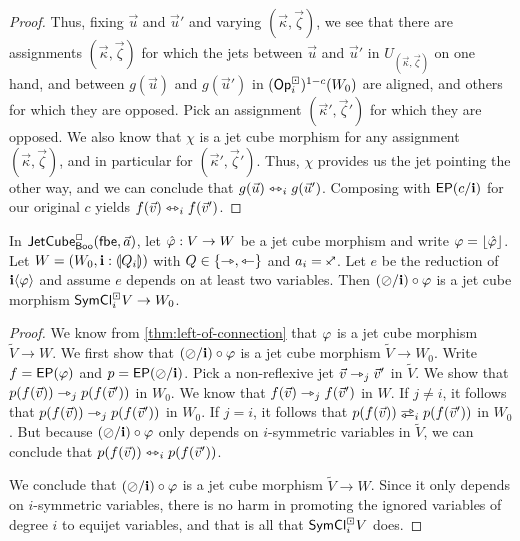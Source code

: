 \documentclass[a4paper]{memoir}
\begin{document}
\begin{proof}
	Thus, fixing $\vec u$ and $\vec u'$ and varying $(\vec \kappa, \vec \zeta)$, we see that there are assignments $(\vec \kappa, \vec \zeta)$ for which the jets between $\vec u$ and $\vec u'$ in $U_{(\vec \kappa, \vec \zeta)}$ on one hand, and between $g(\vec u)$ and $g(\vec u')$ in $({\mathsf{Op}}^\boxdot_i)^{1-c}(W_0)$ are aligned, and others for which they are opposed.
	Pick an assignment $(\vec \kappa', \vec \zeta')$ for which they are opposed.
	We also know that $\chi$ is a jet cube morphism for any assignment $(\vec \kappa, \vec \zeta)$, and in particular for $(\vec \kappa', \vec \zeta')$.
	Thus, $\chi$ provides us the jet pointing the other way, and we can conclude that $g(\vec u) \leftrightarrowtriangle_i g(\vec u')$.
	Composing with $\mathsf{EP}(c/\mathbf{i})$ for our original $c$ yields $f(\vec v) \leftrightarrowtriangle_i f(\vec v')$.
\end{proof}
\begin{corollary} \label{thm:weaken-connection}
	In $\mathsf{JetCube}^{\Box}_{\mathsf{Boo}}\mathopen{}\left( {\mathsf{fbe}},\vec a \right)\mathclose{}$, let $\hat {\varphi} : V \to W$ be a jet cube morphism and write $\varphi = \mathopen{}\left\lfloor \hat {\varphi} \right\rfloor\mathclose{}$.
	Let $W = (W_0, \mathbf{i} : {\llparenthesis Q_i \rrparenthesis})$ with $Q \in \mathopen{}\left\{ \rightarrowtriangle, \leftarrowtriangle \right\}\mathclose{}$ and $a_i = \ypolar$.
	Let $e$ be the reduction of $\mathbf{i} \langle \varphi \rangle$ and assume $e$ depends on at least two variables.
	Then $(\oslash/\mathbf{i}) \circ \varphi$ is a jet cube morphism $\mathsf{SymCl}^\boxdot_i V \to W_0$.
\end{corollary}
\begin{proof}
	We know from \cref{thm:left-of-connection} that $\varphi$ is a jet cube morphism $\tilde V \to W$.
	We first show that $(\oslash / \mathbf{i}) \circ \varphi$ is a jet cube morphism $\tilde V \to W_0$.
	Write $f = \mathsf{EP}(\varphi)$ and $p = \mathsf{EP}(\oslash / \mathbf{i})$.
	Pick a non-reflexive jet $\vec v \rightarrowtriangle_j \vec v'$ in $\tilde{V}$.
	We show that $p(f(\vec v)) \rightarrowtriangle_j p(f(\vec v'))$ in $W_0$.
	We know that $f(\vec v) \rightarrowtriangle_j f(\vec v')$ in $W$.
	If $j \neq i$, it follows that $p(f(\vec v)) \rightarrowtriangle_j p(f(\vec v'))$ in $W_0$.
	If $j = i$, it follows that $p(f(\vec v)) \infrajet_i p(f(\vec v'))$ in $W_0$.
	But because $(\oslash/\mathbf{i}) \circ \varphi$ only depends on $i$-symmetric variables in $\tilde{V}$, we can conclude that $p(f(\vec v)) \leftrightarrowtriangle_i p(f(\vec v'))$.
	
	We conclude that $(\oslash/\mathbf{i}) \circ \varphi$ is a jet cube morphism $\tilde V \to W$.
	Since it only depends on $i$-symmetric variables, there is no harm in promoting the ignored variables of degree $i$ to equijet variables, and that is all that $\mathsf{SymCl}^\boxdot_i V$ does.
\end{proof}
\end{document}
